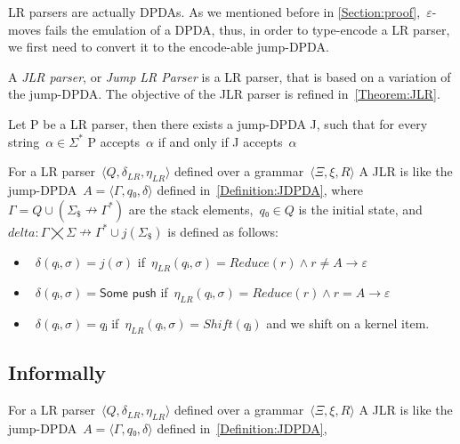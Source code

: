LR parsers are actually DPDAs\@. As we mentioned before in \cref{Section:proof},~$ε$-moves
  fails the emulation of a DPDA, thus, in order to type-encode a LR parser, we first need
  to convert it to the encode-able jump-DPDA\@.

A \emph{JLR parser}, or \emph{Jump LR Parser} is a LR parser, that
  is based on a variation of the jump-DPDA\@.
The objective of the JLR parser is refined in~\cref{Theorem:JLR}.

\begin{Theorem}
  \label{Theorem:JLR}
  Let P be a LR parser, then there exists a jump-DPDA J,
  such that for every string~$α∈Σ^*$
  P accepts~$α$ if and only if J accepts~$α$
\end{Theorem}

For a LR parser~$⟨Q,δ_{LR}, η_{LR}⟩$ defined over a grammar~$⟨Ξ,ξ,R⟩$
A JLR is like the jump-DPDA~$A=⟨Γ,q₀,δ⟩$ defined in~\cref{Definition:JDPDA},
  where~$Γ= Q∪(Σ_\$↛Γ^*)$ are the stack elements,~$q₀∈Q$
  is the initial state, and~$delta:Γ⨉Σ↛Γ^*∪j(Σ_\$)$ is defined as follows:
  \begin{itemize}
   \item~$δ(qᵢ,σ)= j(σ)$ if~$η_{LR}(qᵢ,σ)=Reduce(r)∧r≠A→ε$
   \item~$δ(qᵢ,σ)= \textsf{Some push}$ if~$η_{LR}(qᵢ,σ)=Reduce(r)∧r=A→ε$
   \item~$δ(qᵢ,σ)= qⱼ$ if~$η_{LR}(qᵢ,σ)=Shift(qⱼ)$ and we shift on a kernel item.
  \end{itemize}

\subsection{Informally}

For a LR parser~$⟨Q,δ_{LR}, η_{LR}⟩$ defined over a grammar~$⟨Ξ,ξ,R⟩$
A JLR is like the jump-DPDA~$A=⟨Γ,q₀,δ⟩$ defined in~\cref{Definition:JDPDA},

